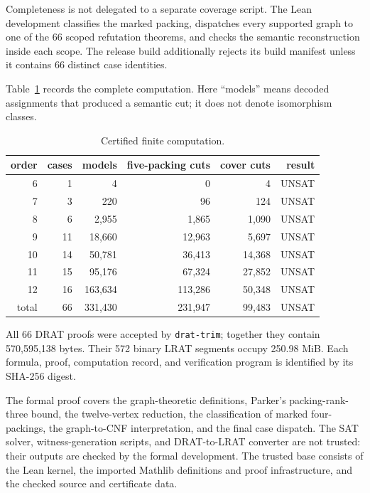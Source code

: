 \documentclass[11pt]{article}
\theoremstyle{definition}
\begin{document}
Completeness is not delegated to a separate coverage script.  The Lean
development classifies the marked packing, dispatches every supported graph to
one of the 66 scoped refutation theorems, and checks the semantic reconstruction
inside each scope.  The release build additionally rejects its build manifest
unless it contains 66 distinct case identities.

Table~\ref{tab:campaign} records the complete computation.  Here ``models''
means decoded assignments that produced a semantic cut; it does not denote
isomorphism classes.

\begin{table}[ht]
\centering
\caption{Certified finite computation.}\label{tab:campaign}
\begin{tabular}{rrrrrr}
\toprule
order & cases & models & five-packing cuts & cover cuts & result \\
\midrule
6  & 1  & 4       & 0       & 4      & UNSAT \\
7  & 3  & 220     & 96      & 124    & UNSAT \\
8  & 6  & 2,955   & 1,865   & 1,090  & UNSAT \\
9  & 11 & 18,660  & 12,963  & 5,697  & UNSAT \\
10 & 14 & 50,781  & 36,413  & 14,368 & UNSAT \\
11 & 15 & 95,176  & 67,324  & 27,852 & UNSAT \\
12 & 16 & 163,634 & 113,286 & 50,348 & UNSAT \\
\midrule
total & 66 & 331,430 & 231,947 & 99,483 & UNSAT \\
\bottomrule
\end{tabular}
\end{table}

All 66 DRAT proofs were accepted by \texttt{drat-trim}; together they contain
570,595,138 bytes.  Their 572 binary LRAT segments occupy 250.98 MiB.  Each
formula, proof, computation record, and verification program is identified by
its SHA-256 digest.

The formal proof covers the graph-theoretic definitions, Parker's
packing-rank-three bound, the twelve-vertex reduction, the classification of
marked four-packings, the graph-to-CNF interpretation, and the final case
dispatch.  The SAT solver, witness-generation scripts, and DRAT-to-LRAT
converter are not trusted: their outputs are checked by the formal
development.  The trusted base consists of the Lean kernel, the imported
Mathlib definitions and proof infrastructure, and the checked source and
certificate data.
\end{document}
